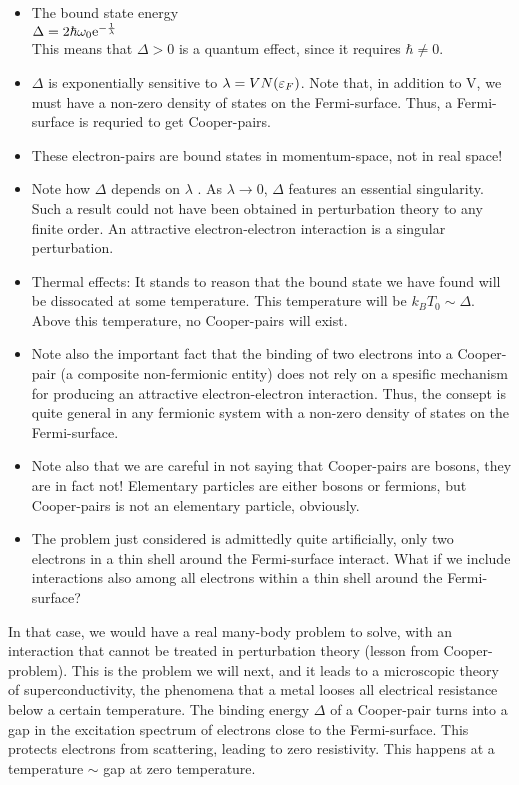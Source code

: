 \begin{itemize}
	\item The bound state energy \\ $\Delta = 2\hbar \omega_0 \mathrm{e}^{-\frac{1}{\lambda}}$ \\ This means that $\Delta > 0$ is a quantum effect, since it requires $\hbar \neq 0$. 
	\item $\Delta$ is exponentially sensitive to $\lambda = VN(\varepsilon_F)$. Note that, in addition to V, we must have a non-zero density of states on the Fermi-surface. Thus, a Fermi-surface is requried to get Cooper-pairs. 
	\item These electron-pairs are bound states in momentum-space, not in real space! 
	\item Note how $\Delta$ depends on $\lambda$ . As $\lambda \to 0$, $\Delta$ features an essential singularity. Such a result could not have been obtained in perturbation theory to any finite order. An attractive electron-electron interaction is a singular perturbation. 
	\item Thermal effects: It stands to reason that the bound state we have found will be dissocated at some temperature. This temperature will be $k_B T_0 \sim \Delta$. Above this temperature, no Cooper-pairs will exist. 
	\item Note also the important fact that the binding of two electrons into a Cooper-pair (a composite non-fermionic entity) does not rely on a spesific mechanism for producing an attractive electron-electron interaction. Thus, the consept is quite general in any fermionic system with a non-zero density of states on the Fermi-surface. 
	\item Note also that we are careful in not saying that Cooper-pairs are bosons, they are in fact not! Elementary particles are either bosons or fermions, but Cooper-pairs is not an elementary particle, obviously. 
	\item The problem just considered is admittedly quite artificially, only two electrons in a thin shell around the Fermi-surface interact. What if we include interactions also among all electrons within a thin shell around the Fermi-surface? 
\end{itemize}

In that case, we would have a real many-body problem to solve, with an interaction that cannot be treated in perturbation theory (lesson from Cooper-problem). This is the problem we will next, and it leads to a microscopic theory of superconductivity, the phenomena that a metal looses all electrical resistance below a certain temperature. The binding energy $\Delta$ of a Cooper-pair turns into a gap in the excitation spectrum of electrons close to the Fermi-surface. This protects electrons from scattering, leading to zero resistivity. This happens at a temperature $\sim$ gap at zero temperature. 